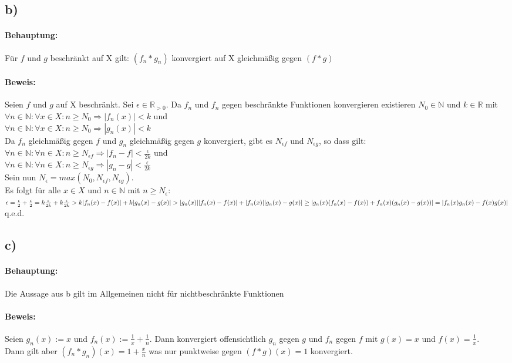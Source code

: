 \subsection*{b)}
\paragraph*{Behauptung:} Für $f$ und $g$ beschränkt auf X gilt: $(f_{n}*g_{n})$ konvergiert auf X gleichmäßig gegen $(f*g)$ 

\paragraph*{Beweis:} Seien $f$ und $g$ auf X beschränkt. Sei $\epsilon \in \mathbb{R}_{>0}$. Da $f_{n}$ und $f_{n}$ gegen beschränkte Funktionen konvergieren existieren $N_{0} \in \mathbb{N}$ und $k \in \mathbb{R}$ mit $\forall n \in \mathbb{N}: \forall x \in X: n \geq N_{0} \Longrightarrow |f_{n}(x)|<k$ und \\
$\forall n \in \mathbb{N}: \forall x \in X: n \geq N_{0} \Longrightarrow |g_{n}(x)|<k$ \\
Da $f_{n}$ gleichmäßig gegen $f$ und $g_{n}$ gleichmäßig gegen $g$ konvergiert, gibt es $N_{\epsilon f}$ und $N_{\epsilon g}$, so dass gilt:\\
$\forall n \in \mathbb{N} : \forall n \in X: n \geq N_{\epsilon f} \Rightarrow |f_{n}-f| < \frac{\epsilon}{2k}$ und \\
$\forall n \in \mathbb{N} : \forall n \in X: n \geq N_{\epsilon g} \Rightarrow |g_{n}-g| < \frac{\epsilon}{2k}$\\
Sein nun $N_{\epsilon} = max(N_{0},N_{\epsilon f},N_{\epsilon g})$.\\
Es folgt für alle $x \in X$ und $n \in \mathbb{N} $ mit $ n \geq N_{\epsilon}$:\\
$\epsilon = \frac{\epsilon}{2} + \frac{\epsilon}{2} = k\frac{\epsilon}{2k} + k\frac{\epsilon}{2k} > k|f_{n}(x)-f(x)|+k|g_{n}(x)-g(x)| > \\
|g_{n}(x)||f_{n}(x)-f(x)|+|f_{n}(x)||g_{n}(x)-g(x)| \geq |g_{n}(x) (f_{n}(x)-f(x))+f_{n}(x)(g_{n}(x)-g(x))| = |f_{n}(x)g_{n}(x)-f(x)g(x)|$
q.e.d.
\subsection*{c)}
\paragraph*{Behauptung:} Die Aussage aus b gilt im Allgemeinen nicht für nichtbeschränkte Funktionen

\paragraph*{Beweis:} Seien $g_{n}(x):=x$ und $f_{n}(x):= \frac{1}{x}+\frac{1}{n}$. Dann konvergiert offensichtlich $g_{n}$ gegen $g$ und $f_{n}$ gegen $f$ mit $g(x)=x$ und $f(x)=\frac{1}{x}$.\\
Dann gilt aber $(f_{n}*g_{n})(x)=1+\frac{x}{n}$ was nur punktweise gegen $(f*g)(x)= 1$ konvergiert.